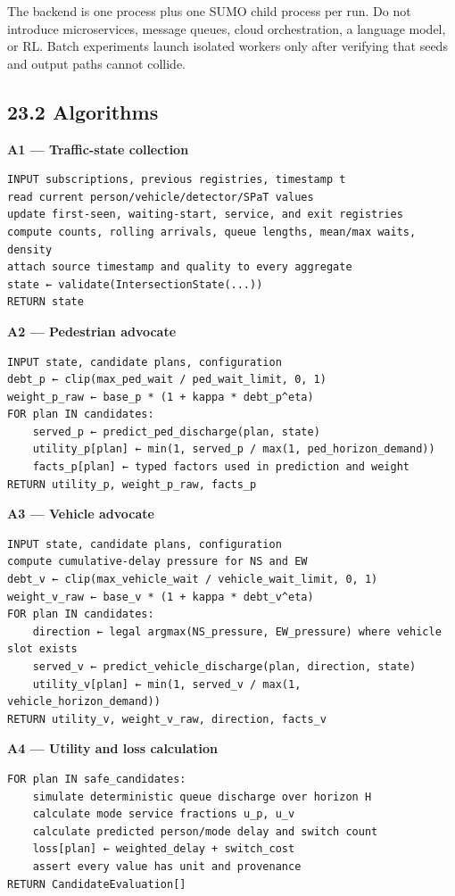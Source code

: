 \documentclass[
  english,
  11pt,
  a4paper,
]{article}
\begin{document}
The backend is one process plus one SUMO child process per run. Do not
introduce microservices, message queues, cloud orchestration, a language
model, or RL. Batch experiments launch isolated workers only after
verifying that seeds and output paths cannot collide.

\subsection{23.2 Algorithms}\label{algorithms}

\textbf{A1 --- Traffic-state collection}

\begin{verbatim}
INPUT subscriptions, previous registries, timestamp t
read current person/vehicle/detector/SPaT values
update first-seen, waiting-start, service, and exit registries
compute counts, rolling arrivals, queue lengths, mean/max waits, density
attach source timestamp and quality to every aggregate
state ← validate(IntersectionState(...))
RETURN state
\end{verbatim}

\textbf{A2 --- Pedestrian advocate}

\begin{verbatim}
INPUT state, candidate plans, configuration
debt_p ← clip(max_ped_wait / ped_wait_limit, 0, 1)
weight_p_raw ← base_p * (1 + kappa * debt_p^eta)
FOR plan IN candidates:
    served_p ← predict_ped_discharge(plan, state)
    utility_p[plan] ← min(1, served_p / max(1, ped_horizon_demand))
    facts_p[plan] ← typed factors used in prediction and weight
RETURN utility_p, weight_p_raw, facts_p
\end{verbatim}

\textbf{A3 --- Vehicle advocate}

\begin{verbatim}
INPUT state, candidate plans, configuration
compute cumulative-delay pressure for NS and EW
debt_v ← clip(max_vehicle_wait / vehicle_wait_limit, 0, 1)
weight_v_raw ← base_v * (1 + kappa * debt_v^eta)
FOR plan IN candidates:
    direction ← legal argmax(NS_pressure, EW_pressure) where vehicle slot exists
    served_v ← predict_vehicle_discharge(plan, direction, state)
    utility_v[plan] ← min(1, served_v / max(1, vehicle_horizon_demand))
RETURN utility_v, weight_v_raw, direction, facts_v
\end{verbatim}

\textbf{A4 --- Utility and loss calculation}

\begin{verbatim}
FOR plan IN safe_candidates:
    simulate deterministic queue discharge over horizon H
    calculate mode service fractions u_p, u_v
    calculate predicted person/mode delay and switch count
    loss[plan] ← weighted_delay + switch_cost
    assert every value has unit and provenance
RETURN CandidateEvaluation[]
\end{verbatim}
\end{document}
